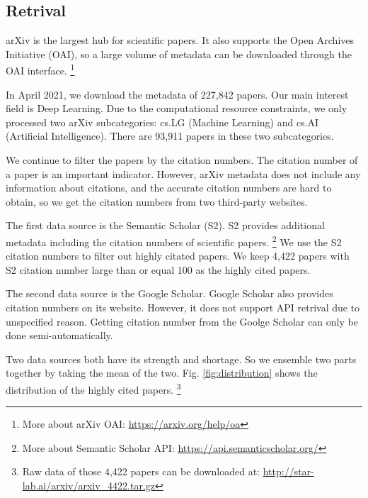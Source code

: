 \subsection{Retrival}

arXiv is the largest hub for scientific papers.
It also supports the Open Archives Initiative (OAI), 
so a large volume of metadata can be downloaded through the OAI interface.
\footnote{More about arXiv OAI: \url{https://arxiv.org/help/oa}}

In April 2021, we download the metadata of 227,842 papers.
Our main interest field is Deep Learning.
Due to the computational resource constraints, we only processed two arXiv subcategories: cs.LG (Machine Learning) and cs.AI (Artificial Intelligence).
There are 93,911 papers in these two subcategories.

We continue to filter the papers by the citation numbers.
The citation number of a paper is an important indicator.
However, arXiv metadata does not include any information about citations,
and the accurate citation numbers are hard to obtain, 
so we get the citation numbers from two third-party websites.

The first data source is the Semantic Scholar (S2).
S2 provides additional metadata including the citation numbers of scientific papers.
\footnote{More about Semantic Scholar API: \url{https://api.semanticscholar.org/}}
We use the S2 citation numbers to filter out highly citated papers.
We keep 4,422 papers with S2 citation number large than or equal 100 as the highly cited papers.

The second data source is the Google Scholar.
Google Scholar also provides citation numbers on its website.
However, it does not support API retrival due to unspecified reason.
Getting citation number from the Goolge Scholar can only be done semi-automatically.

Two data sources both have its strength and shortage.
So we ensemble two parts together by taking the mean of the two.
Fig. \ref{fig:distribution} shows the distribution of the highly cited papers.
\footnote{Raw data of those 4,422 papers can be downloaded at: \url{http://star-lab.ai/arxiv/arxiv_4422.tar.gz}}

